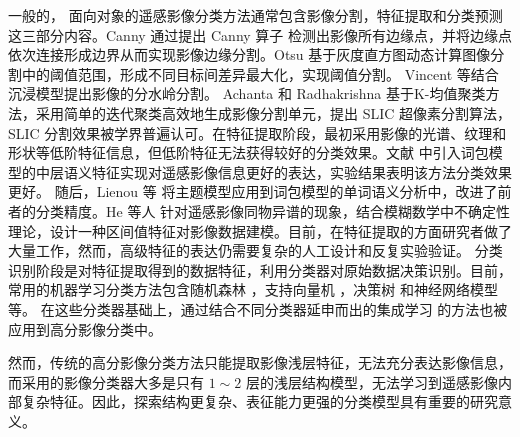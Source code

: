 一般的， 面向对象的遥感影像分类方法通常包含影像分割，特征提取和分类预测这三部分内容。Canny 通过提出 Canny 算子 \cite{canny1987computational} 检测出影像所有边缘点，并将边缘点依次连接形成边界从而实现影像边缘分割。Otsu 基于灰度直方图动态计算图像分割中的阈值范围，形成不同目标间差异最大化，实现阈值分割\cite{otsu1979threshold}。 Vincent \cite{vincent1991watersheds} 等结合沉浸模型提出影像的分水岭分割。 Achanta 和 Radhakrishna \cite{achanta2012slic} 基于K-均值聚类方法，采用简单的迭代聚类高效地生成影像分割单元，提出 SLIC 超像素分割算法，SLIC 分割效果被学界普遍认可。在特征提取阶段，最初采用影像的光谱、纹理和形状等低阶特征信息，但低阶特征无法获得较好的分类效果。文献 \cite{weizman2009urban} 中引入词包模型的中层语义特征实现对遥感影像信息更好的表达，实验结果表明该方法分类效果更好。 随后，Lienou 等\cite{lienou2010semantic} 将主题模型应用到词包模型的单词语义分析中，改进了前者的分类精度。He 等人 \cite{he2016remote} 针对遥感影像同物异谱的现象，结合模糊数学中不确定性理论，设计一种区间值特征对影像数据建模。目前，在特征提取的方面研究者做了大量工作，然而，高级特征的表达仍需要复杂的人工设计和反复实验验证。 分类识别阶段是对特征提取得到的数据特征，利用分类器对原始数据决策识别。目前，常用的机器学习分类方法包含随机森林 \cite{pal2005random}，支持向量机 \cite{suykens1999least} ，决策树 \cite{friedl1997decision} 和神经网络模型 \cite{haykin1994neural} 等。 在这些分类器基础上，通过结合不同分类器延申而出的集成学习 \cite{freund1996experiments} 的方法也被应用到高分影像分类中。

然而，传统的高分影像分类方法只能提取影像浅层特征，无法充分表达影像信息，而采用的影像分类器大多是只有 $1\sim2$ 层的浅层结构模型，无法学习到遥感影像内部复杂特征。因此，探索结构更复杂、表征能力更强的分类模型具有重要的研究意义。

